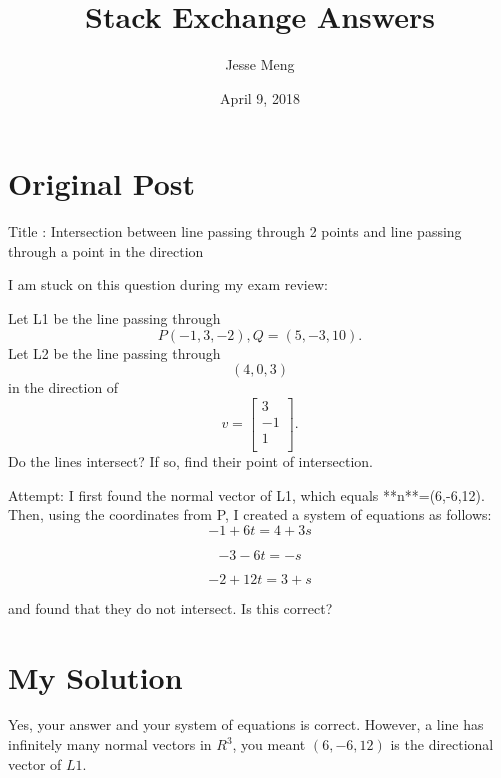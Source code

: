 \documentclass{article}
\title{Stack Exchange Answers}
\author{Jesse Meng }
\date{April 9, 2018}
\begin{document}
\maketitle

\section{Original Post}
Title : Intersection between line passing through 2 points and line passing through a point in the direction

I am stuck on this question during my exam review:

Let L1 be the line passing through $$P(-1,3,-2), Q=(5,-3,10).$$  Let L2 be the line passing through $$(4,0,3)$$ in the direction of $$v=
    \begin{bmatrix}
    3\\
    -1\\
    1\\
    \end{bmatrix}.
$$
Do the lines intersect?  If so, find their point of intersection.

Attempt:
I first found the normal vector of L1, which equals **n**=(6,-6,12).  Then, using the coordinates from P, I created a system of equations as follows: $$-1+6t = 4+3s$$

$$-3-6t=-s$$

$$-2+12t=3+s$$

and found that they do not intersect.  Is this correct? 
\section{My Solution}
Yes, your answer and your system of equations is correct. However, a line has infinitely many normal vectors in $R^3$, you meant $(6,-6,12)$ is the directional vector of $L1$.
\end{document}
